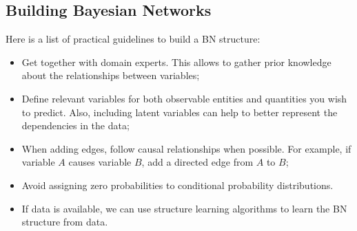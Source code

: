 \subsection{Building Bayesian Networks}
Here is a list of practical guidelines to build a BN structure:
\begin{itemize}
    \item Get together with domain experts. This allows to gather prior knowledge about the relationships between variables;
    \item Define relevant variables for both observable entities and quantities you wish to predict. 
    Also, including latent variables can help to better represent the dependencies in the data;
    \item When adding edges, follow causal relationships when possible. 
    For example, if variable $A$ causes variable $B$, add a directed edge from $A$ to $B$;
    \item Avoid assigning zero probabilities to conditional probability distributions.
    \item If data is available, we can use structure learning algorithms to learn the BN structure from data.
\end{itemize}